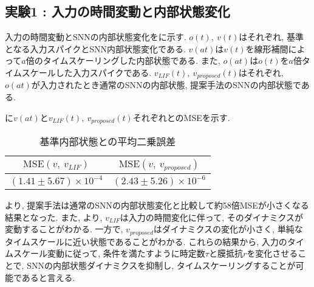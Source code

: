 \makeatletter %
\subsection{実験1 : 入力の時間変動と内部状態変化}

入力の時間変動とSNNの内部状態変化をに示す.
$o(t), ~ v(t)$はそれぞれ, 基準となる入力スパイクとSNN内部状態変化である.
$v(at)$は$v(t)$を線形補間によって$a$倍のタイムスケーリングした内部状態である.
また, $o(at)$は$o(t)$を$a$倍タイムスケールした入力スパイクである.
$v_{LIF}(t),~ v_{proposed}(t)$はそれぞれ, $o(at)$が入力されたとき通常のSNNの内部状態, 提案手法のSNNの内部状態である.

に$v(at)$と$v_{LIF}(t),~ v_{proposed}(t)$それぞれとのMSEを示す.
\begin{table}[htb]
    \centering
    \caption{基準内部状態との平均二乗誤差}
    \label{sec4:tab:exp1}
    \begin{tabular}{cc}
        \hline
        $\mathbf{\mathrm{MSE}(\mathit{v,\ v_{LIF}})}$ & $\mathbf{\mathrm{MSE}(\mathit{v,\ v_{proposed}})}$\\
        \hline
        $(1.41 \pm 5.67) \times 10^{-4}$   & $(2.43\pm 5.26 )\times 10^{-6}$
    \end{tabular}
\end{table}

\textbf{}より, 提案手法は通常のSNNの内部状態変化と比較して約58倍MSEが小さくなる結果となった.
また, \textbf{}より, $v_{LIF}$は入力の時間変化に伴って, そのダイナミクスが変動することがわかる.
一方で, $v_{proposed}$はダイナミクスの変化が小さく, 単純なタイムスケールに近い状態であることがわかる.
これらの結果から, 入力のタイムスケール変動に従って, 条件を満たすように時定数$\tau$と膜抵抗$r$を変化させることで, SNNの内部状態ダイナミクスを抑制し, タイムスケーリングすることが可能であると言える.